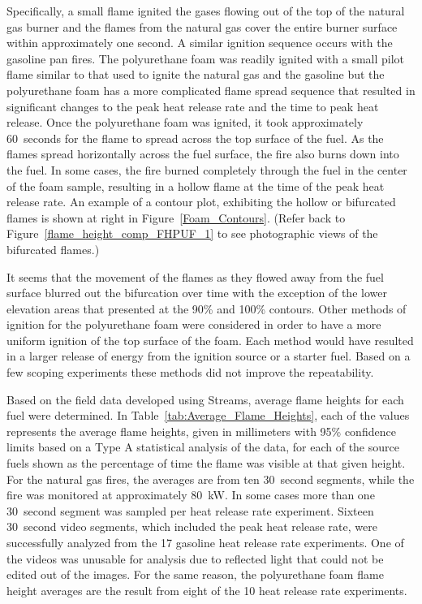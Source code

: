 \documentclass[twoside]{uocthesis}
\begin{document}
{Specifically, a small flame ignited the gases flowing out of the top of the natural gas burner and the flames from the natural gas cover the entire burner surface within approximately one second.  A similar ignition sequence occurs with the gasoline pan fires. The polyurethane foam was readily ignited with a small pilot flame similar to that used to ignite the natural gas and the gasoline but the polyurethane foam has a more complicated flame spread sequence that resulted in significant changes to the peak heat release rate and the time to peak heat release.  Once the polyurethane foam was ignited, it took approximately 60~seconds for the flame to spread across the top surface of the fuel.  As the flames spread horizontally across the fuel surface, the fire also burns down into the fuel.  In some cases, the fire burned completely through the fuel in the center of the foam sample, resulting in a hollow flame at the time of the peak heat release rate.  An example of a contour plot, exhibiting the hollow or bifurcated flames is shown at right in Figure~\ref{Foam_Contours}. (Refer back to Figure~\ref{flame_height_comp_FHPUF_1} to see photographic views of the bifurcated flames.)  

It seems that the movement of the flames as they flowed away from the fuel surface blurred out the bifurcation over time with the exception of the lower elevation areas that presented at the 90\% and 100\% contours.  Other methods of ignition for the polyurethane foam were considered in order to have a more uniform ignition of the top surface of the foam.  Each method would have resulted in a larger release of energy from the ignition source or a starter fuel.   Based on a few scoping experiments these methods did not improve the repeatability.

Based on the field data developed using Streams, average flame heights for each fuel were determined.  In Table~\ref{tab:Average_Flame_Heights}, each of the values represents the average flame heights, given in millimeters with 95\% confidence limits based on a Type A statistical analysis of the data, for each of the source fuels shown as the percentage of time the flame was visible at that given height.  For the natural gas fires, the averages are from ten 30~second segments, while the fire was monitored at approximately 80~kW.  In some cases more than one 30~second segment was sampled per heat release rate experiment.  Sixteen 30~second video segments, which included the peak heat release rate, were successfully analyzed from the 17 gasoline heat release rate experiments.  One of the videos was unusable for analysis due to reflected light that could not be edited out of the images.  For the same reason, the polyurethane foam flame height averages are the result from eight of the 10 heat release rate experiments.

}
\end{document}
